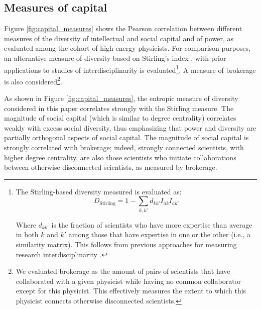 \documentclass{article}
\begin{document}
\subsection{\label{appendix:capital_validation}Measures of capital}

Figure \ref{fig:capital_measures} shows the Pearson correlation between different measures of the diversity of intellectual and social capital and of power, as evaluated among the cohort of high-energy physicists. For comparison purposes, an alternative measure of diversity based on Stirling's index \citep{Stirling2007}, with prior applications to studies of interdisciplinarity \citep{Porter2007,Leahey2016} is evaluated\footnote{The Stirling-based diversity measured is evaluated as: \begin{equation}
    D_{\text{Stirling}} = 1-\sum_{k,k'}d_{kk'}I_{ak}I_{ak'}
\end{equation}

Where $d_{kk'}$ is the fraction of scientists who have more expertise than average in both $k$ and $k'$ among those that have expertise in one or the other (i.e., a similarity matrix). This  follows from previous approaches for measuring research interdisciplinarity \citealt{Porter2007,Leahey2016}.}. A measure of brokerage is also considered\footnote{We evaluated brokerage as the amount of pairs of scientists that have collaborated with a given physicist while having no common collaborator except for this physicist. This effectively measures the extent to which this physicist connects otherwise disconnected scientists.}. 

As shown in Figure \ref{fig:capital_measures}, the entropic measure of diversity considered in this paper correlates strongly with the Stirling measure. The magnitude of social capital (which is similar to degree centrality) correlates weakly with excess social diversity, thus emphasizing that power and diversity are partially orthogonal aspects of social capital. The magnitude of social capital is strongly correlated with brokerage; indeed, strongly connected scientists, with higher degree centrality, are also those scientists who initiate collaborations between otherwise disconnected scientists, as measured by brokerage.
\end{document}
